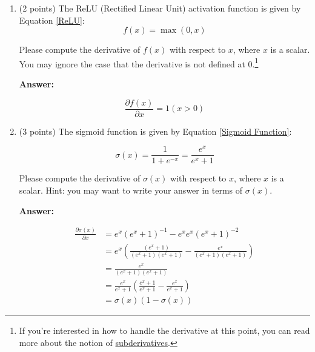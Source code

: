 \documentclass{article}
\newenvironment{answer}{
    {\bf Answer:} \sf \begingroup\color{red}
}{\endgroup}%
\begin{document}
\begin{enumerate}[label=(\alph*)]
\begin{shaded}
\begin{answer}
\end{answer}
\end{shaded}

\item (2 points) The ReLU (Rectified Linear Unit) activation function is given by Equation \ref{ReLU}:
\begin{equation}
    \label{ReLU}
    f(x) = \max(0, x)
\end{equation}

Please compute the derivative of $f(x)$ with respect to $x$, where $x$ is a scalar. You may ignore the case that the derivative is not defined at 0.\footnote{If you're interested in how to handle the derivative at this point, you can read more about the notion of \hyperref[https://en.wikipedia.org/wiki/Subderivative]{subderivatives}.}

\begin{shaded}
\begin{answer}
    \begin{equation}
        \frac{\partial f(x)}{\partial x}=1(x>0)
    \end{equation}
\end{answer}
\end{shaded}

\item (3 points) The sigmoid function is given by Equation \ref{Sigmoid Function}:

\begin{equation}
    \label{Sigmoid Function}
    \sigma (x) = \frac{1}{1 + e^{-x}} = \frac{e^{x}}{e^{x} + 1}
\end{equation}

Please compute the derivative of $\sigma(x)$ with respect to $x$, where $x$ is a scalar. Hint: you may want to write your answer in terms of $\sigma(x)$.

\begin{shaded}
\begin{answer}
    \begin{align}
        \frac{\partial \sigma(x)}{\partial x} &= e^{x}(e^x+1)^{-1}-e^{x}e^{x}(e^x+1)^{-2} \\
        &= e^{x}\left(\frac{(e^x+1)}{(e^x+1)(e^x+1)} - \frac{e^{x}}{(e^x+1)(e^x+1)}\right) \\
        &= \frac{e^{x}}{(e^x+1)(e^x+1)} \\
        &= \frac{e^{x}}{e^x+1}\left(\frac{e^x+1}{e^x+1}-\frac{e^x}{e^x+1}\right) \\
        &= \sigma(x)(1-\sigma(x))
    \end{align}
\end{answer}
\end{shaded}


\end{enumerate}
\end{document}
